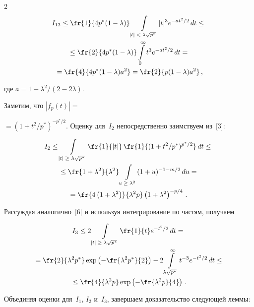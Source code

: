 \begin{multicols}{2}
\begin{multline*}
I_{12} \le \fr{1}{4p^*(1-\lambda)}\int\limits_{|t|\; <\; \lambda \sqrt{p^*}} |t|^3 e^{-at^2/2} \,dt

 \leq{}\\

 {}\leq \fr{2}{4p^*(1-\lambda)} \int\limits^{\infty}_{0} t^3 e^{-at^2/2}\,dt ={}\\

{}=\fr{4}{4p^*(1-\lambda)a^2} =\fr{2}{p(1-\lambda)a^2}\,,

\end{multline*}

где $a = 1 - \lambda^2/(2-2\lambda)$.

Заметим, что $|f_p (t)| =$\linebreak

$= (1 + t^2/p^*)^{-p^*/2}$. Оценку для~$I_2$ непосредственно заимствуем из~[3]:

\begin{multline*}

I_2 \leq \int\limits_{|t|\; \ge\; \lambda \sqrt{p^*}} \fr{1}{|t|}\, \fr{1}{(1 +t^2/p^*)^{p^*/2}}\,dt \leq{}\\

{} \leq \fr{1+ \lambda^2}{\lambda^2} \int\limits_{u \;\ge\; \lambda^2} (1+u)^{-1-m/2}\,du ={} \\

                   =\fr{4\left(1+ \lambda^2\right)}{\lambda^2 p} \left(1+\lambda^2\right)^{-p/4}\,.

\end{multline*}

Рассуждая аналогично~[6] и используя интегрирование по частям, получаем

\begin{multline*}

I_3 \leq 2 \int\limits_{|t|\; \ge\; \lambda \sqrt{p^*}} \fr{1}{t} e^{-t^2/2}\,dt ={}\\

{}= \fr{2}{\lambda^2 p^*} \exp \left(-\fr{\lambda^2 p^*}{2}\right)

                    -2 \int\limits^{\infty}_{\lambda \sqrt{p^*}} t^{-3} e^{-t^2/2}\,dt \leq{}\\

                    {}\leq \fr{4}{\lambda^2 p} \exp \left(-\fr{\lambda^2 p}{4}\right)\,.

\end{multline*}

Объединяя оценки для~$I_1$, $I_2$ и~$I_3$, завершаем доказательство следующей леммы:




\end{multicols}
